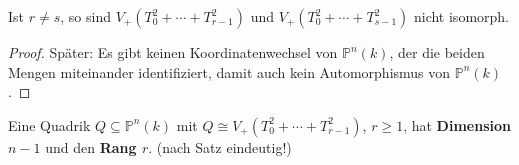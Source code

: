 \begin{prop}[orig. 59]
  \label{prop:quadrik-in-normalform}
  Ist $r\neq s$, so sind $V_{+}(T_{0}^{2}+\cdots+T_{r-1}^{2})$ und
  $V_{+}(T_{0}^{2}+\cdots+T_{s-1}^{2})$ nicht isomorph.
\end{prop}
\begin{proof}
  Später: Es gibt keinen Koordinatenwechsel von $\mathbb{P}^{n}(k)$,
  der die beiden Mengen miteinander identifiziert, damit auch kein Automorphismus von
  $\mathbb{P}^{n}(k)$.
\end{proof}

\begin{defn}
  \label{def:dim-und-rang-einer-quadrik}
  Eine Quadrik $Q\subseteq\mathbb{P}^{n}(k)$ mit
  $Q\cong V_{+}(T_{0}^{2}+\cdots+T_{r-1}^{2})$, $r\geq1$, hat \textbf{Dimension $n-1$} und den \textbf{Rang $r$}. (nach Satz
  eindeutig!)
\end{defn}

